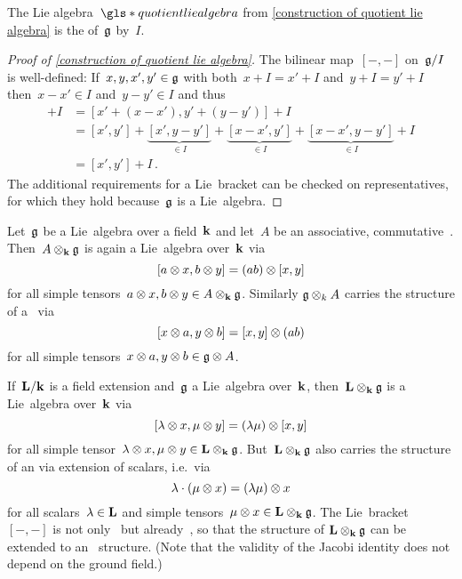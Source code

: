 \begin{definition}
  The Lie algebra~$\gls*{quotient lie algebra}$ from \cref{construction of quotient lie algebra} is the  of~$\mathfrak{g}$ by~$I$.
\end{definition}



\begin{proof}[Proof of \cref*{construction of quotient lie algebra}]
  The bilinear map~$[-,-]$ on~$\mathfrak{g}/I$ is well-defined:
  If~$x, y, x', y' \in \mathfrak{g}$ with both~$x+I = x'+I$ and~$y+I = y'+I$ then~$x-x' \in I$ and~$y-y' \in I$ and thus
  \begin{align*}
    [x,y] + I
    &=
    [x' + (x-x'), y' + (y-y')] + I \\
    &=
    [x',y']
    + \underbrace{[x', y-y']}_{\in I}
    + \underbrace{[x-x', y']}_{\in I}
    + \underbrace{[x-x', y-y']}_{\in I}
    + I
    \\
    &=
    [x', y'] + I  \,.
  \end{align*}
  The additional requirements for a Lie~bracket can be checked on representatives, for which they hold because~$\mathfrak{g}$ is a Lie~algebra.
\end{proof}


\begin{lemma}
  \label{quasi extension of scalars for lie algebras}
  Let~$\mathfrak{g}$ be a Lie~algebra over a field~$\kf$ and let~$A$ be an associative, commutative~{\algebra{$\kf$}}.
  Then~$A \otimes_{\mathbf{k}} \mathfrak{g}$ is again a Lie~algebra over~$\kf$ via
  \[
    [a \otimes x, b \otimes y]
    =
    (ab) \otimes [x,y]
  \]
  for all simple tensors~$a \otimes x, b \otimes y \in A \otimes_{\mathbf{k}} \mathfrak{g}$.
  Similarly $\mathfrak{g} \otimes_k A$ carries the structure of a~{\liealgebra{$\kf$}} via
  \[
    [x \otimes a, y \otimes b]
    =
    [x,y] \otimes (ab)
  \]
  for all simple tensors~$x \otimes a, y \otimes b \in \mathfrak{g} \otimes A$.
\end{lemma}


\begin{example}
  If~$\mathbf{L}/\mathbf{k}$ is a field extension and~$\mathfrak{g}$ a Lie~algebra over~$\kf$, then~$\mathbf{L} \otimes_{\mathbf{k}} \mathfrak{g}$ is a Lie~algebra over~$\kf$ via
  \[
    [\lambda \otimes x, \mu \otimes y]
    = 
    (\lambda \mu) \otimes [x,y]
  \]
  for all simple tensor~$\lambda \otimes x, \mu \otimes y \in \mathbf{L} \otimes_{\mathbf{k}} \mathfrak{g}$.
  But~$\mathbf{L} \otimes_{\mathbf{k}} \mathfrak{g}$ also carries the structure of an {\vectorspace{$\Lf$}} via extension of scalars, i.e.\ via
  \[
    \lambda \cdot (\mu \otimes x)
    =
    (\lambda \mu) \otimes x
  \]
  for all scalars~$\lambda \in \mathbf{L}$ and simple tensors~$\mu \otimes x \in \mathbf{L} \otimes_{\mathbf{k}} \mathfrak{g}$.
  The Lie~bracket~$[-,-]$ is not only~{\bilinear{$\kf$}} but already~{\bilinear{$\Lf$}}, so that the {\liealgebra{$\kf$}} structure of $\mathbf{L} \otimes_{\mathbf{k}} \mathfrak{g}$ can be extended to an~{\liealgebra{$\Lf$}} structure.
  (Note that the validity of the Jacobi identity does not depend on the ground field.)
\end{example}


